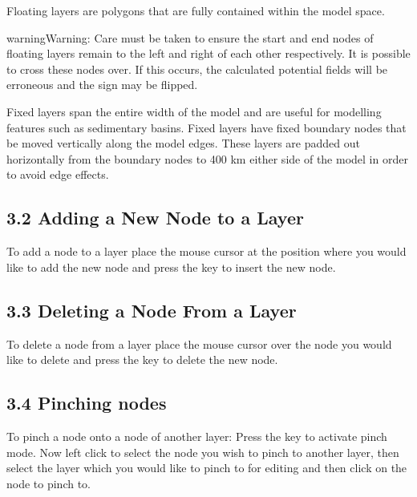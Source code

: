 \documentclass[a4paper,12pt,english]{sphinxmanual}
\begin{document}

Floating layers are polygons that are fully contained within the model space.

\begin{sphinxadmonition}{warning}{Warning:}
Care must be taken to ensure the start and end nodes of floating layers remain to the left and right of each other respectively.
It is possible to cross these nodes over. If this occurs, the calculated potential fields will be erroneous and the sign
may be flipped.
\end{sphinxadmonition}


Fixed layers span the entire width of the model and are useful for modelling features such as sedimentary basins.
Fixed layers have fixed boundary nodes that  be moved vertically along the model edges.
These layers are padded out horizontally from the boundary nodes to 400 km either side of
the model in order to avoid edge effects.


\subsection{3.2 Adding a New Node to a Layer}
\label{\detokenize{manual__layer_nodes:adding-a-new-node-to-a-layer}}
To add a node to a layer place the mouse cursor at the position where you would like to add the new node and
press the  key to insert the new node.


\subsection{3.3 Deleting a Node From a Layer}
\label{\detokenize{manual__layer_nodes:deleting-a-node-from-a-layer}}
To delete a node from a layer place the mouse cursor over the node you would like to delete and
press the  key to delete the new node.


\subsection{3.4 Pinching nodes}
\label{\detokenize{manual__layer_nodes:pinching-nodes}}
To pinch a node onto a node of another layer: Press the  key to activate pinch mode.
Now left click to select the node you wish to pinch to another layer, then select the layer which you would like to pinch
to for editing and then click on the node to pinch to.
\end{document}
